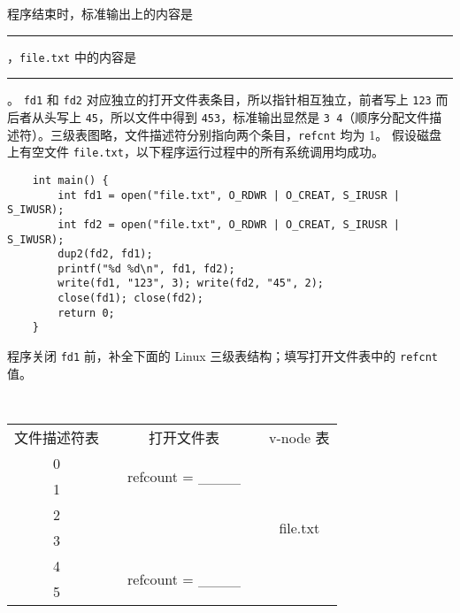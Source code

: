 \begin{problems}
\begin{table}[H]
        \end{table}
        \qn 程序结束时，标准输出上的内容是 \rule{3.5cm}{0.25mm}，\verb|file.txt| 中的内容是 \rule{3.5cm}{0.25mm}。
        \sol \verb|fd1| 和 \verb|fd2| 对应独立的打开文件表条目，所以指针相互独立，前者写上 \verb|123| 而后者从头写上 \verb|45|，所以文件中得到 \verb|453|，标准输出显然是 \verb|3 4|（顺序分配文件描述符）。三级表图略，文件描述符分别指向两个条目，\verb|refcnt| 均为 1。
        \pro 假设磁盘上有空文件 \verb|file.txt|，以下程序运行过程中的所有系统调用均成功。
        \begin{verbatim}
    int main() {
        int fd1 = open("file.txt", O_RDWR | O_CREAT, S_IRUSR | S_IWUSR); 
        int fd2 = open("file.txt", O_RDWR | O_CREAT, S_IRUSR | S_IWUSR); 
        dup2(fd2, fd1);
        printf("%d %d\n", fd1, fd2);
        write(fd1, "123", 3); write(fd2, "45", 2);
        close(fd1); close(fd2);
        return 0;
    }
        \end{verbatim}
        \qn 程序关闭 \verb|fd1| 前，补全下面的 Linux 三级表结构；填写打开文件表中的 \verb|refcnt| 值。
        \begin{table}[H]
            \tt
            \centering
            \begin{tabular}{ccccc}
                文件描述符表 & {\qquad \qquad \qquad} & 打开文件表 & {\qquad \qquad \qquad} & v-node 表 \\ \cline{1-1} \cline{3-3} \cline{5-5} 
                \multicolumn{1}{|c|}{0} & \multicolumn{1}{c|}{} & \multicolumn{1}{c|}{\multirow{2}{*}{refcount = \_\_\_\_}} & \multicolumn{1}{c|}{} & \multicolumn{1}{c|}{\multirow{6}{*}{file.txt}} \\ \cline{1-1}
                \multicolumn{1}{|c|}{1} & \multicolumn{1}{c|}{} & \multicolumn{1}{c|}{} & \multicolumn{1}{c|}{} & \multicolumn{1}{c|}{} \\ \cline{1-1} \cline{3-3}
                \multicolumn{1}{|c|}{2} &  &  & \multicolumn{1}{c|}{} & \multicolumn{1}{c|}{} \\ \cline{1-1}
                \multicolumn{1}{|c|}{3} &  &  & \multicolumn{1}{c|}{} & \multicolumn{1}{c|}{} \\ \cline{1-1} \cline{3-3}
                \multicolumn{1}{|c|}{4} & \multicolumn{1}{c|}{} & \multicolumn{1}{c|}{\multirow{2}{*}{refcount = \_\_\_\_}} & \multicolumn{1}{c|}{} & \multicolumn{1}{c|}{} \\ \cline{1-1}
                \multicolumn{1}{|c|}{5} & \multicolumn{1}{c|}{} & \multicolumn{1}{c|}{} & \multicolumn{1}{c|}{} & \multicolumn{1}{c|}{} \\ \cline{1-1} \cline{3-3} \cline{5-5} 

\end{tabular}
\end{table}
\end{problems}
